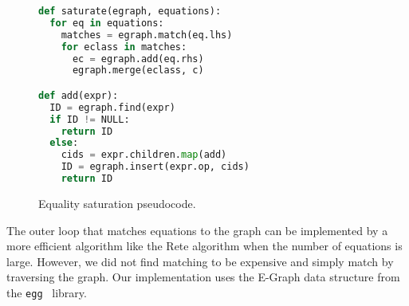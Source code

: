 \begin{figure}
\begin{lstlisting}[language=Python]
def saturate(egraph, equations):
  for eq in equations: 
    matches = egraph.match(eq.lhs)
    for eclass in matches: 
      ec = egraph.add(eq.rhs)
      egraph.merge(eclass, c)

def add(expr):
  ID = egraph.find(expr)
  if ID != NULL:
    return ID
  else:
    cids = expr.children.map(add)
    ID = egraph.insert(expr.op, cids)
    return ID
\end{lstlisting}
    \caption{Equality saturation pseudocode. 
}
    \label{eqsat}
    \vspace{7pt}
\end{figure}

The outer loop that matches equations to the graph can be implemented by a more
efficient algorithm like the Rete algorithm \cite{DBLP:journals/ai/Forgy82} when
the number of equations is large. However, we did not find matching to be
expensive and simply match by traversing the graph. Our implementation uses the
E-Graph data structure from the \texttt{egg}~\cite{willsey2020egg} library. 
